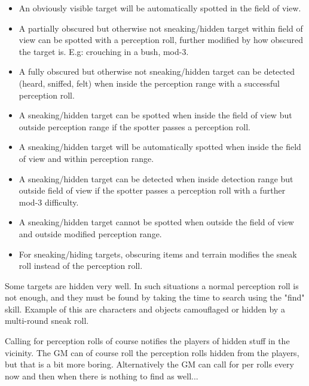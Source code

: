 \begin{itemize}

\item An obviously visible target will be automatically spotted in the field of view.

\item A partially obscured but otherwise not sneaking/hidden target within field of view can be spotted with a perception roll, further modified by how obscured the target is. E.g: crouching in a bush, mod-3.

\item A fully obscured but otherwise not sneaking/hidden target can be detected (heard, sniffed, felt) when inside the perception range with a successful perception roll.

\item A sneaking/hidden target can be spotted when inside the field of view but outside perception range if the spotter passes a perception roll.

\item A sneaking/hidden target will be automatically spotted when inside the field of view and within perception range.

\item A sneaking/hidden target can be detected when inside detection range but outside field of view if the spotter passes a perception roll with a further mod-3 difficulty.

\item A sneaking/hidden target cannot be spotted when outside the field of view and outside modified perception range.

\item For sneaking/hiding targets, obscuring items and terrain modifies the sneak roll instead of the perception roll.

\end{itemize}

Some targets are hidden very well. In such situations a normal perception roll is not enough, and they must be found by taking the time to search using the "find" skill. Example of this are characters and objects camouflaged or hidden by a multi-round sneak roll.

Calling for perception rolls of course notifies the players of hidden stuff in the vicinity.
The GM can of course roll the perception rolls hidden from the players, but that is a bit more boring. Alternatively the GM can call for per rolls every now and then when there is nothing to find as well...


